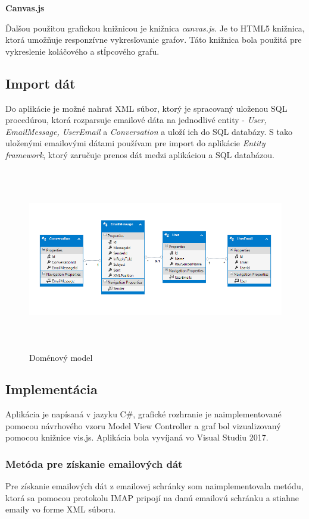 \documentclass[slovak,master,public,dept460,male,cpdeclaration,oneside]{diploma}
\begin{document}
\hfill \break

\textbf{Canvas.js}

Ďalšou použitou grafickou knižnicou je knižnica \textit{canvas.js}. Je to HTML5 knižnica, ktorá umožňuje responzívne vykresľovanie grafov. Táto knižnica bola použitá pre vykreslenie koláčového a stĺpcového grafu. \cite{canvas}



\subsection{Import dát}
Do aplikácie je možné nahrať XML súbor, ktorý je spracovaný uloženou SQL procedúrou, ktorá rozparsuje emailové dáta na jednodlivé entity - \textit{User, EmailMessage, UserEmail} a \textit{Conversation} a uloží ich do SQL databázy. S tako uloženými emailovými dátami používam pre import do aplikácie \textit{Entity framework}, ktorý zaručuje prenos dát medzi aplikáciou a SQL databázou.


\begin{figure}[H]
\centering
\includegraphics[width=16cm, height=8cm]{figures/domain_model}
\caption{Doménový model}
\end{figure}




\subsection{Implementácia}
Aplikácia je napísaná v jazyku C\#, grafické rozhranie je naimplementované pomocou návrhového vzoru Model View Controller a graf bol vizualizovaný pomocou knižnice vis.js. Aplikácia bola vyvíjaná vo Visual Studiu 2017.

\subsubsection{Metóda pre získanie emailových dát}
Pre získanie emailových dát z emailovej schránky som naimplementovala metódu, ktorá sa pomocou protokolu IMAP pripojí na danú emailovú schránku a stiahne emaily vo forme XML súboru. 
\end{document}
